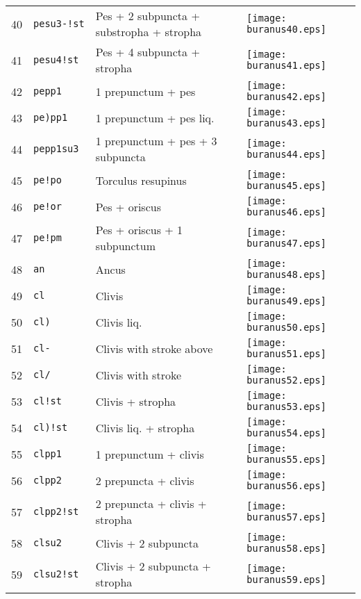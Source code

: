 \documentclass{scrarticle}
\begin{document}
\begin{longtable}{l|l|l|l}
40 & \texttt{pesu3-!st} & Pes + 2 subpuncta + substropha + stropha & \texttt{[image: buranus40.eps]} \\
41 & \texttt{pesu4!st} & Pes + 4 subpuncta + stropha & \texttt{[image: buranus41.eps]} \\
42 & \texttt{pepp1} & 1 prepunctum + pes & \texttt{[image: buranus42.eps]} \\
43 & \texttt{pe)pp1} & 1 prepunctum + pes liq. & \texttt{[image: buranus43.eps]} \\
44 & \texttt{pepp1su3} & 1 prepunctum + pes + 3 subpuncta & \texttt{[image: buranus44.eps]} \\
45 & \texttt{pe!po} & Torculus resupinus & \texttt{[image: buranus45.eps]} \\
46 & \texttt{pe!or} & Pes + oriscus & \texttt{[image: buranus46.eps]} \\
47 & \texttt{pe!pm} & Pes + oriscus + 1 subpunctum & \texttt{[image: buranus47.eps]} \\
48 & \texttt{an} & Ancus & \texttt{[image: buranus48.eps]} \\
49 & \texttt{cl} & Clivis & \texttt{[image: buranus49.eps]} \\
50 & \texttt{cl)} & Clivis liq. & \texttt{[image: buranus50.eps]} \\
51 & \texttt{cl-} & Clivis with stroke above & \texttt{[image: buranus51.eps]} \\
52 & \texttt{cl/} & Clivis with stroke & \texttt{[image: buranus52.eps]} \\
53 & \texttt{cl!st} & Clivis + stropha & \texttt{[image: buranus53.eps]} \\
54 & \texttt{cl)!st} & Clivis liq. + stropha & \texttt{[image: buranus54.eps]} \\
55 & \texttt{clpp1} & 1 prepunctum + clivis & \texttt{[image: buranus55.eps]} \\
56 & \texttt{clpp2} & 2 prepuncta + clivis & \texttt{[image: buranus56.eps]} \\
57 & \texttt{clpp2!st} & 2 prepuncta + clivis + stropha & \texttt{[image: buranus57.eps]} \\
58 & \texttt{clsu2} & Clivis + 2 subpuncta & \texttt{[image: buranus58.eps]} \\
59 & \texttt{clsu2!st} & Clivis + 2 subpuncta + stropha & \texttt{[image: buranus59.eps]} \\

\end{longtable}
\end{document}
